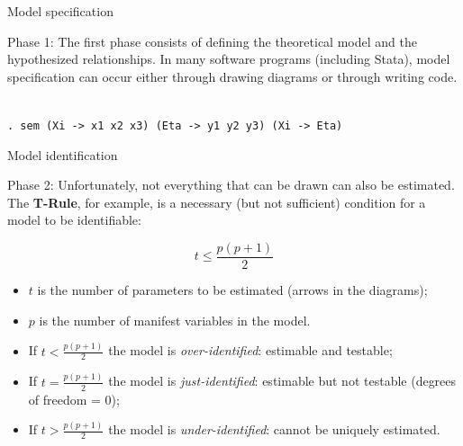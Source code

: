 \documentclass{beamer}
\begin{document}
\begin{frame}{Model specification}
    \begin{block}{Phase 1:}
        The first phase consists of defining the theoretical model and the hypothesized relationships. In many software programs (including Stata), model specification can occur either through drawing diagrams or through writing code. \\
        \vspace{1em}
        \centering
         \\
        \vspace{1em}
        \small
        \texttt{. sem (Xi -> x1 x2 x3) (Eta -> y1 y2 y3) (Xi -> Eta)}
    \end{block}
\end{frame}

\begin{frame}{Model identification}
    \begin{block}{Phase 2:}
        Unfortunately, not everything that can be drawn can also be estimated. The \textbf{T-Rule}, for example, is a necessary (but not sufficient) condition for a model to be identifiable:
    \end{block}
    \[
    t \leq \frac{p(p+1)}{2}
    \]
    \begin{itemize}
        \item $t$ is the number of parameters to be estimated (arrows in the diagrams);
        \item $p$ is the number of manifest variables in the model.
    \end{itemize}
    \vspace{1em}
    \small
    \begin{itemize}
        \item If $t < \frac{p(p+1)}{2}$ the model is \textit{over-identified}: estimable and testable;
        \item If $t = \frac{p(p+1)}{2}$ the model is \textit{just-identified}: estimable but not testable (degrees of freedom = 0);
        \item If $t > \frac{p(p+1)}{2}$ the model is \textit{under-identified}: cannot be uniquely estimated.
    \end{itemize}
\end{frame}
\end{document}
